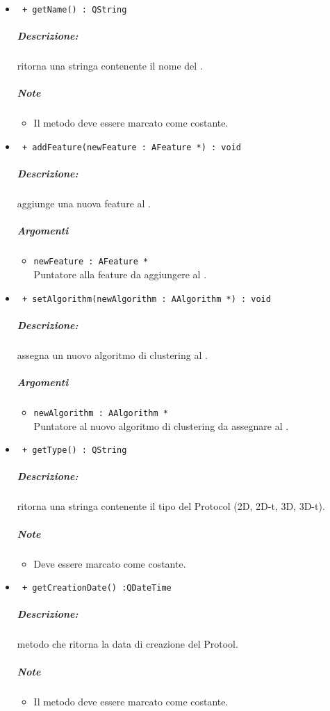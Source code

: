 \begin{itemize}
		\item \color{blue}\verb! + getName() : QString !
		\color{black}
		\subparagraph{Descrizione:} ritorna una stringa contenente il nome del \protocol{}.
		\subparagraph{Note}
			\begin{itemize}
				\item  Il metodo deve essere marcato come costante.
			\end{itemize}
		
		\item \color{blue}\verb! + addFeature(newFeature : AFeature *) : void !
		\color{black}
		\subparagraph{Descrizione:} aggiunge una nuova feature\g{} al \protocol{}.
		\subparagraph{Argomenti}
			\begin{itemize}
				\item \color{RoyalPurple} \verb!newFeature : AFeature *! \\ 
				\color{Black}Puntatore alla feature\g{} da aggiungere al \protocol{}. 
			\end{itemize}
			
		\item \color{blue}\verb! + setAlgorithm(newAlgorithm : AAlgorithm *) : void !
		\color{black}
		\subparagraph{Descrizione:} assegna un nuovo algoritmo di clustering\g{} al \protocol{}.
		\subparagraph{Argomenti}
			\begin{itemize}
				\item \color{RoyalPurple} \verb!newAlgorithm : AAlgorithm *! \\ 
				\color{black}Puntatore al nuovo algoritmo di clustering\g{} da assegnare al \protocol{}. 
			\end{itemize}
			
		\item \color{blue}\verb! + getType() : QString !\\
		\color{black}
		\subparagraph{Descrizione:} ritorna una stringa contenente il tipo del Protocol\g{} (2D, 2D-t, 3D, 3D-t).
		\subparagraph{Note}
			\begin{itemize}
				\item Deve essere marcato come costante.
			\end{itemize}
			
		\item \color{blue}\verb! + getCreationDate() :QDateTime!\\
		\color{black}
		\subparagraph{Descrizione:} metodo che ritorna la data di creazione del Protool\g{}.
		\subparagraph{Note}
			\begin{itemize}
				\item Il metodo deve essere marcato come costante.
			\end{itemize}
	
	\end{itemize}






